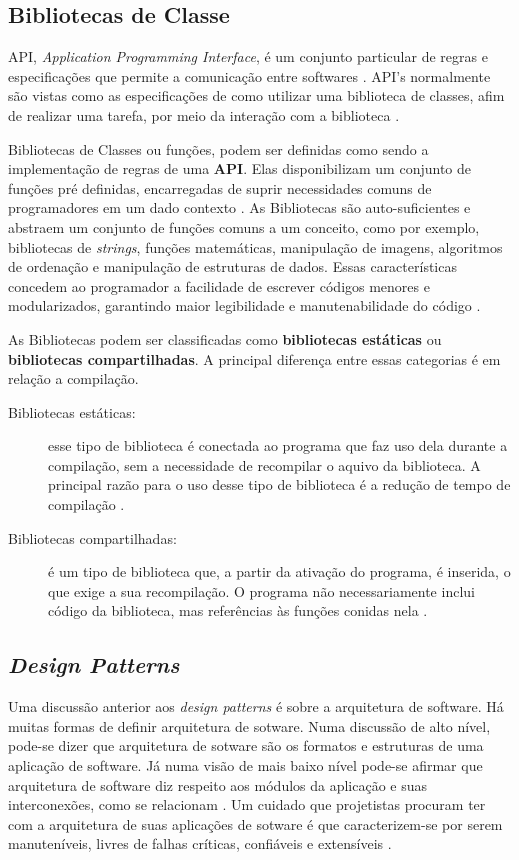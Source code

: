 \subsection{Bibliotecas de Classe}
API, \textit{Application Programming Interface}, é um conjunto particular de regras e especificações que permite a comunicação entre  softwares \cite{simsek2004}. API's normalmente são vistas como as especificações de como utilizar uma biblioteca de classes, afim de realizar uma tarefa, por meio da interação com a biblioteca \cite{simsek2004}.
\par
\indent Bibliotecas de Classes ou funções, podem ser definidas como sendo a implementação de regras de uma \textbf{API}. Elas disponibilizam um conjunto de funções pré definidas, encarregadas de suprir necessidades comuns de programadores em um dado contexto \cite{simsek2004}. As Bibliotecas são auto-suficientes e abstraem um conjunto de funções comuns a um conceito, como por exemplo, bibliotecas de \textit{strings}, funções matemáticas, manipulação de imagens, algoritmos de ordenação e manipulação de estruturas de dados. Essas características concedem ao programador a facilidade de escrever códigos menores e modularizados, garantindo maior legibilidade e manutenabilidade do código \cite{simsek2004}.
\par
\indent As Bibliotecas podem ser classificadas como \textbf{bibliotecas estáticas} ou \textbf{bibliotecas compartilhadas}. A principal diferença entre essas categorias é em relação a compilação.
\begin{description}
\item[Bibliotecas estáticas:] esse tipo de biblioteca é conectada ao programa que faz uso dela durante a compilação, sem a necessidade de recompilar o aquivo da biblioteca. A principal razão para o uso desse tipo de biblioteca é a redução de tempo de compilação \cite{simsek2004}.
\item[Bibliotecas compartilhadas:] é um tipo de biblioteca que, a partir da ativação do programa, é inserida, o que exige a sua recompilação. O programa não necessariamente inclui código da biblioteca, mas referências às funções conidas nela \cite{simsek2004}.
\end{description}

\subsection{\textit{Design Patterns}}
Uma discussão anterior aos \textit{design patterns} é sobre a arquitetura de software. Há muitas formas de definir arquitetura de sotware. Numa discussão de alto nível, pode-se dizer que arquitetura de sotware são os formatos e estruturas de uma aplicação de software. Já numa visão de mais baixo nível pode-se afirmar que arquitetura de software diz respeito aos módulos da aplicação e suas interconexões, como se relacionam \cite{martin2000}. Um cuidado que projetistas procuram ter com a arquitetura de suas aplicações de sotware é que caracterizem-se por serem manuteníveis, livres de falhas críticas, confiáveis e extensíveis \cite{kleinWeiss2009}.

